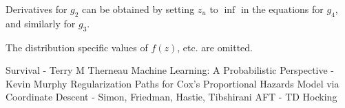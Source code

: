 \documentclass[12pt,a4paper]{report}
\begin{document}
Derivatives for $g_2$ can be obtained by setting $z_u$ to $\inf$ in the equations for $g_4$, and similarly for $g_3$.

The distribution specific values of $f(z)$, etc. are omitted.

\begin{thebibliography}{1}
 Survival - Terry M Therneau
 Machine Learning: A Probabilistic Perspective - Kevin Murphy
 Regularization Paths for Cox's Proportional Hazards Model via Coordinate Descent - Simon, Friedman, Hastie, Tibshirani
 AFT - TD Hocking
\end{thebibliography}
\end{document}

